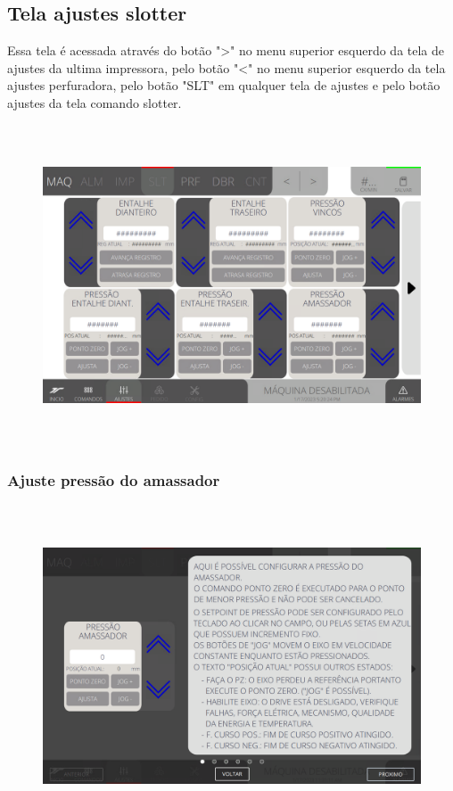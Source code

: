 \thispagestyle{fancy}
\vspace*{40 pt}
\subsection{Tela ajustes slotter}
 Essa tela é acessada através do botão "\textgreater" no menu superior esquerdo da tela de ajustes da ultima impressora, pelo botão "\textless{}" no menu superior esquerdo 
 da tela ajustes perfuradora, pelo botão "SLT" em qualquer tela de ajustes e pelo botão ajustes da tela comando slotter.
 \vspace*{\fill}
 \begin{figure}[h]
  \centering
  \includegraphics[width=576px,height=360px]{src/imagesFlexo/05-slotter/settings/e-Tela-Principal.png}
\end{figure}
\vspace*{\fill}

\newpage
\thispagestyle{fancy}
\vspace*{40 pt}
\subsubsection{\small{Ajuste pressão do amassador}}
\vspace*{\fill}
\begin{figure}[h]
  \centering
  \includegraphics[width=576px,height=360px]{src/imagesFlexo/05-slotter/settings/e-1.png}
\end{figure}
\vspace*{\fill}

